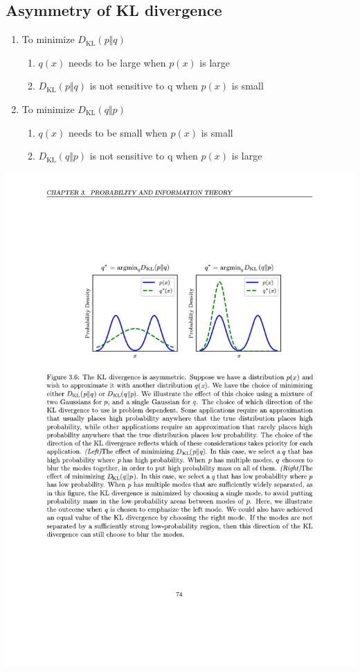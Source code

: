 \documentclass[12pt, a4paper]{article}
\newcommand{\dkl}[2]{D_{\mathrm{KL}}(#1 \Vert #2)}
\begin{document}
\newpage
\begin{appendices}

\section{Asymmetry of KL divergence}
\label{app:asy_kl} 
\begin{enumerate}
    \item To minimize $\dkl{p}{q}$
        \begin{enumerate}
            \item $q(x)$ needs to be large when $p(x)$ is large
            \item $\dkl{p}{q}$ is not sensitive to q when $p(x)$ is small
        \end{enumerate}
    \item To minimize $\dkl{q}{p}$
        \begin{enumerate}
            \item $q(x)$ needs to be small when $p(x)$ is small
            \item $\dkl{q}{p}$ is not sensitive to q when $p(x)$ is large
        \end{enumerate}
\end{enumerate}
\includegraphics[width=\textwidth]{../imgs/Asymmetry_of_KL_divergence.pdf}



\end{appendices}
\end{document}
